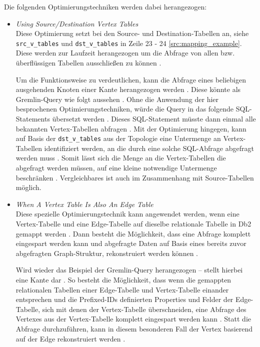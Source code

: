 Die folgenden Optimierungstechniken werden dabei herangezogen:
\begin{itemize}
    \item \textit{Using Source/Destination Vertex Tables}\\
    Diese Optimierung setzt bei den Source- und Destination-Tabellen an, siehe \texttt{src\_v\_tables} und \texttt{dst\_v\_tables} in Zeile 23 - 24 \autoref{src:mapping_example}. Diese werden zur Laufzeit herangezogen um die Abfrage von allen bzw. überflüssigen Tabellen ausschließen zu können \cite{sigmod_tian}.

    Um die Funktionsweise zu verdeutlichen, kann die Abfrage eines beliebigen ausgehenden Knoten einer Kante herangezogen werden \cite{sigmod_tian}. Diese könnte als Gremlin-Query wie folgt aussehen  \cite{sigmod_tian}. Ohne die Anwendung der hier besprochenen Optimierungstechniken, würde die Query in das folgende SQL-Statements übersetzt werden  \cite{sigmod_tian}. Dieses SQL-Statement müsste dann einmal alle bekannten Vertex-Tabellen abfragen \cite{sigmod_tian}. Mit der Optimierung hingegen, kann auf Basis der \texttt{dst\_v\_tables} aus der Topologie eine Untermenge an Vertex-Tabellen identifiziert werden, an die durch eine solche SQL-Abfrage abgefragt werden muss \cite{sigmod_tian}. Somit lässt sich die Menge an die Vertex-Tabellen die abgefragt werden müssen, auf eine kleine notwendige Untermenge beschränken \cite{sigmod_tian}. Vergleichbares ist auch im Zusammenhang mit Source-Tabellen möglich.

    \item \textit{When A Vertex Table Is Also An Edge Table}\\
    Diese spezielle Optimierungstechnik kann angewendet werden, wenn eine Vertex-Tabelle und eine Edge-Tabelle auf dieselbe relationale Tabelle in Db2 gemappt werden \cite{sigmod_tian}. Dann besteht die Möglichkeit, dass eine Abfrage komplett eingespart werden kann und abgefragte Daten auf Basis eines  bereits zuvor abgefragten Graph-Struktur, rekonstruiert werden können \cite{sigmod_tian}. 

    Wird wieder das Beispiel der Gremlin-Query  herangezogen --  stellt hierbei eine Kante dar \cite{sigmod_tian}. So besteht die Möglichkeit, dass wenn die gemappten relationalen Tabellen einer Edge-Tabelle und Vertex-Tabelle einander entsprechen und die Prefixed-IDs definierten Properties und Felder der Edge-Tabelle, sich mit denen der Vertex-Tabelle überschneiden, eine Abfrage des Vertexes aus der Vertex-Tabelle komplett eingespart werden kann \cite{sigmod_tian}. Statt die Abfrage durchzuführen, kann in diesem besonderen Fall der Vertex basierend auf der Edge  rekonstruiert werden \cite{sigmod_tian}.


\end{itemize}
